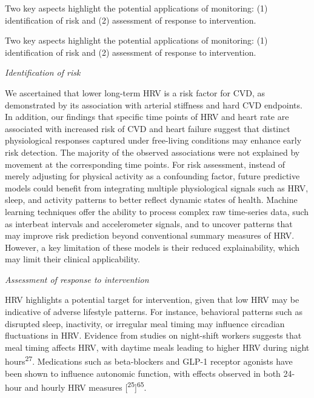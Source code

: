 \documentclass[
  a4paper,
  headsepline=true,
  open=any]{scrbook}
\begin{document}
Two key aspects highlight the potential applications of monitoring: (1)
identification of risk and (2) assessment of response to intervention.

Two key aspects highlight the potential applications of monitoring: (1)
identification of risk and (2) assessment of response to intervention.

\emph{Identification of risk}

We ascertained that lower long-term HRV is a risk factor for CVD, as
demonstrated by its association with arterial stiffness and hard CVD
endpoints. In addition, our findings that specific time points of HRV
and heart rate are associated with increased risk of CVD and heart
failure suggest that distinct physiological responses captured under
free-living conditions may enhance early risk detection. The majority of
the observed associations were not explained by movement at the
corresponding time points. For risk assessment, instead of merely
adjusting for physical activity as a confounding factor, future
predictive models could benefit from integrating multiple physiological
signals such as HRV, sleep, and activity patterns to better reflect
dynamic states of health. Machine learning techniques offer the ability
to process complex raw time-series data, such as interbeat intervals and
accelerometer signals, and to uncover patterns that may improve risk
prediction beyond conventional summary measures of HRV. However, a key
limitation of these models is their reduced explainability, which may
limit their clinical applicability.

\emph{Assessment of response to intervention}

HRV highlights a potential target for intervention, given that low HRV
may be indicative of adverse lifestyle patterns. For instance,
behavioral patterns such as disrupted sleep, inactivity, or irregular
meal timing may influence circadian fluctuations in HRV. Evidence from
studies on night-shift workers suggests that meal timing affects HRV,
with daytime meals leading to higher HRV during night
hours\textsuperscript{27}. Medications such as beta-blockers and GLP-1
receptor agonists have been shown to influence autonomic function, with
effects observed in both 24-hour and hourly HRV measures
{[}\textsuperscript{25}{]}\textsuperscript{65}.
\end{document}
